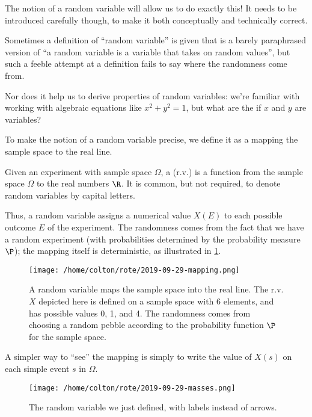 \documentclass{ccg-topic}
\begin{document}
The notion of a random variable will allow us to do exactly this! It needs to be introduced carefully though, to make it both conceptually and technically correct. 

Sometimes a definition of ``random variable'' is given that is a barely paraphrased version of ``a random variable is a variable that takes on random values'', but such a feeble attempt at a definition fails to say where the randomness come from.

Nor does it help us to derive properties of random variables: we’re familiar with working with algebraic equations like $x^2 + y^2 = 1$, but what are the  if $x$ and $y$ are  variables? 

To make the notion of a random variable precise, we define it as a  mapping the sample space to the real line.

\begin{defn}
    \label{defn:random_variable}
    Given an experiment with sample space $\Omega$, a  (r.v.) is a function from the sample space $\Omega$ to the real numbers $\R$. It is common, but not required, to denote random variables by capital letters.
\end{defn}

Thus, a random variable assigns a numerical value $X(E)$ to each possible outcome $E$ of the experiment. The randomness comes from the fact that we have a random experiment (with probabilities determined by the probability measure $\P$); the mapping itself is deterministic, as illustrated in \ref{fig:/home/colton/rote/2019-09-29-mapping}.

\begin{figure}[htpb]
    \centering
    \texttt{[image: /home/colton/rote/2019-09-29-mapping.png]}
    \caption{A random variable maps the sample space into the real line. The r.v. $X$ depicted here is defined on a sample space with 6 elements, and has possible values 0, 1, and 4. The randomness comes from choosing a random pebble according to the probability function $\P$ for the sample space.}
    \label{fig:/home/colton/rote/2019-09-29-mapping}
\end{figure}

A simpler way to ``see'' the mapping is simply to write the value of $X(s)$ on each simple event $s$ in $\Omega$.
\begin{figure}[htpb]
    \centering
    \texttt{[image: /home/colton/rote/2019-09-29-masses.png]}
    \caption{The random variable we just defined, with labels instead of arrows.}
    \label{fig:/home/colton/rote/2019-09-29-masses}
\end{figure}
\end{document}
